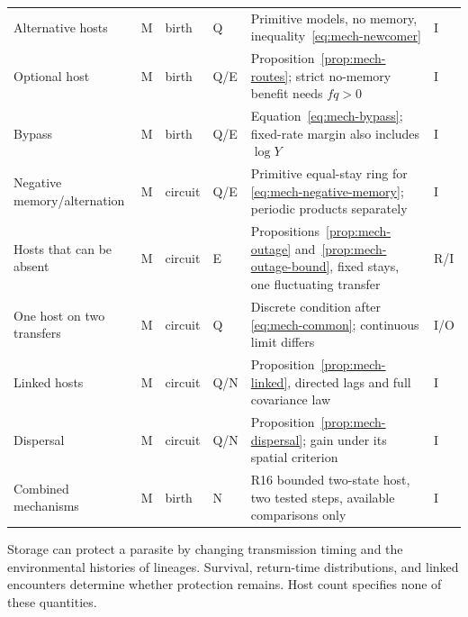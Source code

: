 \begin{table}[htbp]
\begin{tabular*}{\textwidth}{@{\extracolsep{\fill}}p{}p{}p{}p{}p{}p{}@{}}
Alternative hosts & M & birth & Q & Primitive models, no memory, inequality~\eqref{eq:mech-newcomer} & I\\
Optional host & M & birth & Q/E & Proposition~\ref{prop:mech-routes}; strict no-memory benefit needs \(fq>0\) & I\\
Bypass & M & birth & Q/E & Equation~\eqref{eq:mech-bypass}; fixed-rate margin also includes \(\log Y\) & I\\
Negative memory/alternation & M & circuit & Q/E & Primitive equal-stay ring for \eqref{eq:mech-negative-memory}; periodic products separately & I\\
Hosts that can be absent & M & circuit & E & Propositions~\ref{prop:mech-outage} and~\ref{prop:mech-outage-bound}, fixed stays, one fluctuating transfer & R/I\\
One host on two transfers & M & circuit & Q & Discrete condition after \eqref{eq:mech-common}; continuous limit differs & I/O\\
Linked hosts & M & circuit & Q/N & Proposition~\ref{prop:mech-linked}, directed lags and full covariance law & I\\
Dispersal & M & circuit & Q/N & Proposition~\ref{prop:mech-dispersal}; gain under its spatial criterion & I\\
Combined mechanisms & M & birth & N & R16 bounded two-state host, two tested steps, available comparisons only & I\\\bottomrule
\end{tabular*}
\end{table}

Storage can protect a parasite by changing transmission timing and the environmental histories of lineages. Survival, return-time distributions, and linked encounters determine whether protection remains. Host count specifies none of these quantities.
